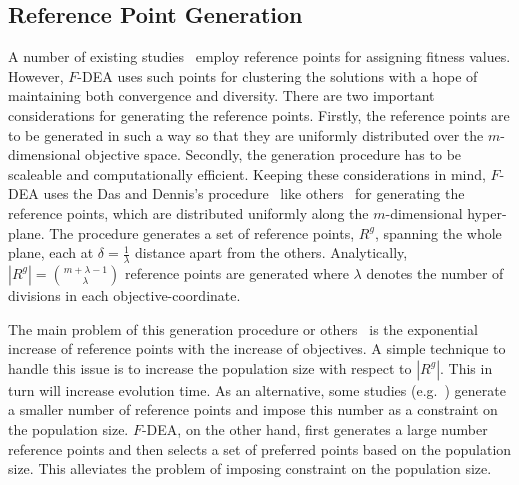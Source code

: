 \documentclass[review]{elsarticle}
\begin{document}
\subsection{Reference Point Generation}
\label{subsec: globalReferencePoint}
A number of existing studies~\citep{deb2014evolutionary,thetadominance7080938,
deb2006reference,piceag,referencevectorguided,epcs} employ reference points for assigning fitness values. However, $F$-DEA uses 
such points for clustering the solutions with a hope of maintaining both convergence and diversity. There are two important 
considerations for generating the reference points. 
Firstly, the reference points are to be generated in such a way so that they are uniformly distributed over the $m$-dimensional objective space. 
Secondly, the generation procedure has to be scaleable and computationally efficient. Keeping these considerations in mind, $F$-DEA uses the Das and Dennis's procedure~\citep{das1998normal} like others~\citep{deb2014evolutionary,zhang2007moea,thetadominance7080938} for generating the reference points, which are  distributed uniformly along the $m$-dimensional hyper-plane. %
The procedure generates a set of reference points, $R^g$, spanning the whole plane, each at $\delta = \frac{1}{\lambda}$ distance apart from the others. Analytically, $\left|R^g\right| = \binom{m+\lambda-1}{\lambda}$ reference points are generated where $\lambda$ denotes the number of divisions in each objective-coordinate.

The main problem of this generation procedure or others~\citep{zhang2007moea} is the exponential increase of reference points with the increase of objectives. A simple technique to handle this issue is to increase the population size with respect to $\left|R^g\right|$. This in turn  will increase evolution time. As an alternative, some studies (e.g.~\citep{thetadominance7080938,deb2014evolutionary}) generate a smaller number of reference points and impose this number as a constraint on the population size. $F$-DEA, on the other hand, first generates a large number reference points and then selects a set of  preferred points based on the population size. This alleviates the problem of imposing constraint on the population size.
\end{document}
